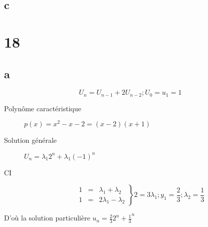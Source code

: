 \subsection{c}

\section{18}
\subsection{a}
$$	U_n = U_{n-1}+2U_{n-2} ; U_0 = u_1 = 1$$
\begin{description}
	\item[Polynôme caractéristique] $p(x) = x^2 -x - 2 = (x-2)(x+1)$
\item[Solution générale] $U_n = \lambda_1 2^n + \lambda_1 (-1)^n$
\item[CI]
\begin{displaymath}
	\left. \begin{array}{lll}
		1 &=&  \lambda_1 + \lambda_2\\
		1 &=&  2 \lambda_1 - \lambda_2
	\end{array}
	\right\}
	2 = 3 \lambda_1;
	y_1 = \frac{2}{3};
	\lambda_2 = \frac{1}{3}
\end{displaymath}
\end{description}
D'où la solution particulière $u_n = \frac{2}{3} 2^n + \frac{1}{3}^n$

